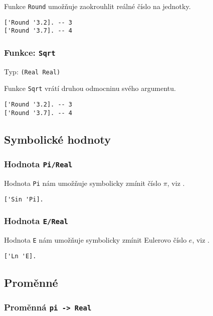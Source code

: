 Funkce \lstinline{Round} umožňuje zaokrouhlit reálné číslo na jednotky.

\begin{lstlisting}[caption={Ukázka využití Round}]
['Round '3.2]. -- 3
['Round '3.7]. -- 4
\end{lstlisting}

\subsubsection*{Funkce: \lstinline{Sqrt}}
Typ: \lstinline{(Real Real)}

Funkce \lstinline{Sqrt} vrátí druhou odmocninu svého argumentu.

\begin{lstlisting}[caption={Ukázka využití Round}]
['Round '3.2]. -- 3
['Round '3.7]. -- 4
\end{lstlisting}

\subsection{Symbolické hodnoty}

\subsubsection*{Hodnota \lstinline{Pi/Real}}

Hodnota \lstinline{Pi} nám umožňuje symbolicky zmínit číslo $\pi$, viz .

\begin{lstlisting}[caption={Ukázka využití Pi}]
['Sin 'Pi].
\end{lstlisting}

\subsubsection*{Hodnota \lstinline{E/Real}}

Hodnota \lstinline{E} nám umožňuje symbolicky zmínit Eulerovo číslo $e$,
viz .

\begin{lstlisting}[caption={Ukázka využití E}]
['Ln 'E].
\end{lstlisting}

\subsection{Proměnné}

\subsubsection*{Proměnná \lstinline{pi -> Real}}

